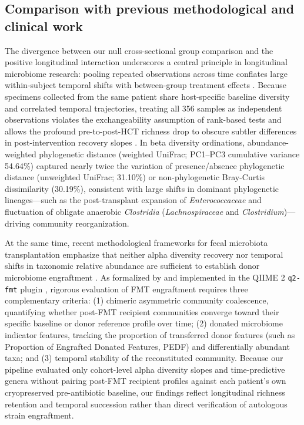 \subsection{Comparison with previous methodological and clinical work}
The divergence between our null cross-sectional group comparison and the positive longitudinal interaction underscores a central principle in longitudinal microbiome research: pooling repeated observations across time conflates large within-subject temporal shifts with between-group treatment effects \citep{herman2024assessingb,zhang2026bayesian}. Because specimens collected from the same patient share host-specific baseline diversity and correlated temporal trajectories, treating all 356 samples as independent observations violates the exchangeability assumption of rank-based tests and allows the profound pre-to-post-HCT richness drop to obscure subtler differences in post-intervention recovery slopes \citep{herman2024assessingb,zhou2021linda}. In beta diversity ordinations, abundance-weighted phylogenetic distance (weighted UniFrac; PC1--PC3 cumulative variance 54.64\%) captured nearly twice the variation of presence/absence phylogenetic distance (unweighted UniFrac; 31.10\%) or non-phylogenetic Bray-Curtis dissimilarity (30.19\%), consistent with large shifts in dominant phylogenetic lineages---such as the post-transplant expansion of \textit{Enterococcaceae} and fluctuation of obligate anaerobic \textit{Clostridia} (\textit{Lachnospiraceae} and \textit{Clostridium})---driving community reorganization.

At the same time, recent methodological frameworks for fecal microbiota transplantation emphasize that neither alpha diversity recovery nor temporal shifts in taxonomic relative abundance are sufficient to establish donor microbiome engraftment \citep{herman2024assessing,herman2024assessingb}. As formalized by \citet{herman2024assessingb} and implemented in the QIIME 2 \texttt{q2-fmt} plugin \citep{herman2024assessing}, rigorous evaluation of FMT engraftment requires three complementary criteria: (1) chimeric asymmetric community coalescence, quantifying whether post-FMT recipient communities converge toward their specific baseline or donor reference profile over time; (2) donated microbiome indicator features, tracking the proportion of transferred donor features (such as Proportion of Engrafted Donated Features, PEDF) and differentially abundant taxa; and (3) temporal stability of the reconstituted community. Because our pipeline evaluated only cohort-level alpha diversity slopes and time-predictive genera without pairing post-FMT recipient profiles against each patient's own cryopreserved pre-antibiotic baseline, our findings reflect longitudinal richness retention and temporal succession rather than direct verification of autologous strain engraftment.

